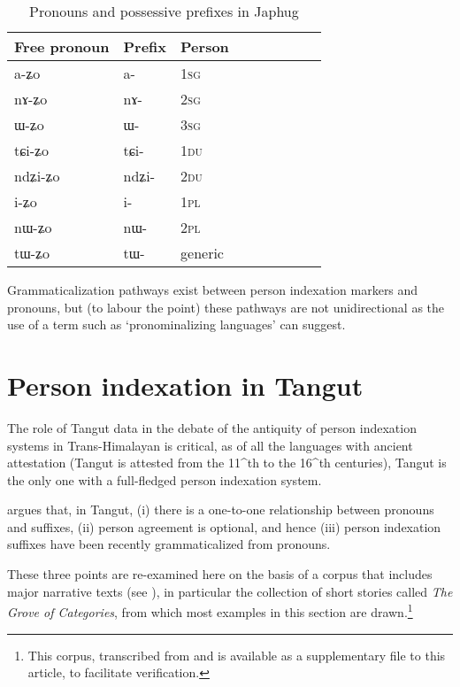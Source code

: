 \documentclass[oldfontcommands,oneside,a4paper,11pt]{article}
\newcommand{\ipa}[1]{{\phon \mbox{#1}}} %
\begin{document}
 \begin{table}[H] \centering
\caption{Pronouns and possessive prefixes in Japhug}\label{tab:pronoun}
\begin{tabular}{lllllllll} 
\toprule
 Free pronoun & Prefix & Person\\
\midrule
 \ipa{a-ʑo}  &	\ipa{a-}  &		1\textsc{sg} \\
\ipa{nɤ-ʑo}  &	\ipa{nɤ-}  &			2\textsc{sg}\\
\ipa{ɯ-ʑo}  &	\ipa{ɯ-}  &			3\textsc{sg}\\
\midrule
\ipa{tɕi-ʑo}  &	\ipa{tɕi-}  &			1\textsc{du} \\
\ipa{ndʑi-ʑo}  &	\ipa{ndʑi-}  &		2\textsc{du} \\	
\midrule
\ipa{i-ʑo}    &	\ipa{i-}  &			1\textsc{pl} \\
\ipa{nɯ-ʑo}   &	\ipa{nɯ-}  &			2\textsc{pl} \\
\midrule
\ipa{tɯ-ʑo} & \ipa{tɯ-}   &  generic\\
\bottomrule
\end{tabular}
\end{table}

 Grammaticalization pathways exist between person indexation markers and pronouns, but (to labour the point) these pathways are not unidirectional as the use of a term such as `pronominalizing languages' can suggest.  

\section{Person indexation in Tangut}
The role of Tangut data in the debate of the antiquity of person indexation systems in Trans-Himalayan is critical, as of all the languages with ancient attestation (Tangut is attested from the 11^{th} to the 16^{th} centuries), Tangut is the only one with a full-fledged person indexation system.



\citet{lapolla92} argues that, in Tangut, (i) there is a one-to-one relationship between pronouns and suffixes, (ii) person agreement is optional, and hence (iii) person indexation suffixes have been recently grammaticalized from pronouns.  

These three points are re-examined here on the basis of a corpus that includes major narrative texts (see \citealt[8-9]{jacques14esquisse}), in particular the collection of short stories called  \textit{The Grove of Categories}, from which most examples in this section are drawn.\footnote{This corpus, transcribed from \citet{kepping83} and \citet{leilin90} is available as a supplementary file to this article, to facilitate verification.
}
\end{document}
